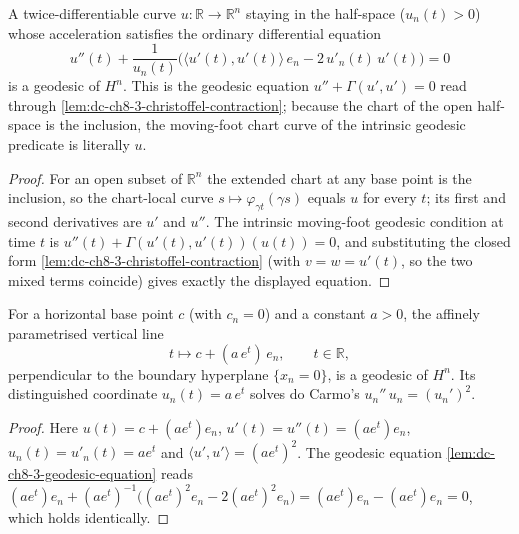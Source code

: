 \begin{lemma}
  \label{lem:dc-ch8-3-geodesic-equation}
  \leanok
  A twice-differentiable curve $u:\mathbb R\to\mathbb R^n$ staying in the
  half-space ($u_n(t)>0$) whose acceleration satisfies the ordinary differential
  equation
  $$
  u''(t)+\frac{1}{u_n(t)}\Big(\langle u'(t),u'(t)\rangle\, e_n-2\,u'_n(t)\,u'(t)\Big)=0
  $$
  is a geodesic of $H^n$. This is the geodesic equation $u''+\Gamma(u',u')=0$ read
  through \cref{lem:dc-ch8-3-christoffel-contraction}; because the chart of the open
  half-space is the inclusion, the moving-foot chart curve of the intrinsic geodesic
  predicate is literally $u$.
\end{lemma}
\begin{proof}
  \leanok
  For an open subset of $\mathbb R^n$ the extended chart at any base point is the
  inclusion, so the chart-local curve $s\mapsto\varphi_{\gamma t}(\gamma s)$ equals
  $u$ for every $t$; its first and second derivatives are $u'$ and $u''$. The
  intrinsic moving-foot geodesic condition at time $t$ is
  $u''(t)+\Gamma(u'(t),u'(t))(u(t))=0$, and substituting the closed form
  \cref{lem:dc-ch8-3-christoffel-contraction} (with $v=w=u'(t)$, so the two mixed
  terms coincide) gives exactly the displayed equation.
\end{proof}

\begin{lemma}
  \label{lem:dc-ch8-3-vertical-geodesic}
  \leanok
  For a horizontal base point $c$ (with $c_n=0$) and a constant $a>0$, the affinely
  parametrised vertical line
  $$
  t\longmapsto c+(a\,e^{t})\,e_n,\qquad t\in\mathbb R,
  $$
  perpendicular to the boundary hyperplane $\{x_n=0\}$, is a geodesic of $H^n$. Its
  distinguished coordinate $u_n(t)=a\,e^{t}$ solves do Carmo's $u_n''\,u_n=(u_n')^2$.
\end{lemma}
\begin{proof}
  \leanok
  Here $u(t)=c+(a e^{t})e_n$, $u'(t)=u''(t)=(a e^{t})e_n$, $u_n(t)=u'_n(t)=a e^{t}$
  and $\langle u',u'\rangle=(a e^{t})^2$. The geodesic equation
  \cref{lem:dc-ch8-3-geodesic-equation} reads
  $(a e^{t})e_n+(a e^{t})^{-1}\big((a e^{t})^2 e_n-2(a e^{t})^2 e_n\big)
  =(a e^{t})e_n-(a e^{t})e_n=0$, which holds identically.
\end{proof}


